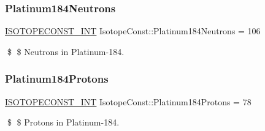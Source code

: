\subsubsection{\texorpdfstring{Platinum184\+Neutrons}{Platinum184Neutrons}}
{\footnotesize\ttfamily \mbox{\hyperlink{group___isotope_const-_macros_ga5f18360b3e99483a35c32d789e62621c}{I\+S\+O\+T\+O\+P\+E\+C\+O\+N\+S\+T\+\_\+\+I\+NT}} Isotope\+Const\+::\+Platinum184\+Neutrons = 106}

\$ \$ Neutrons in Platinum-\/184. \mbox{\label{group___isotope_const-_platinum-_pt184_gab85fbbe7917d5f61eae20d3f76cd173d}} 
\subsubsection{\texorpdfstring{Platinum184\+Protons}{Platinum184Protons}}
{\footnotesize\ttfamily \mbox{\hyperlink{group___isotope_const-_macros_ga5f18360b3e99483a35c32d789e62621c}{I\+S\+O\+T\+O\+P\+E\+C\+O\+N\+S\+T\+\_\+\+I\+NT}} Isotope\+Const\+::\+Platinum184\+Protons = 78}

\$ \$ Protons in Platinum-\/184. 